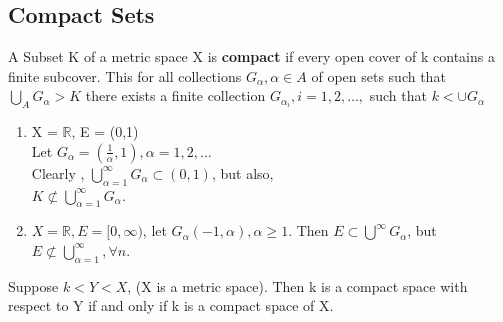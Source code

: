 \documentclass[11pt,fleqn]{book} %
\begin{document}
\subsection{Compact Sets} %

\begin{definition}
	A Subset K of a metric space X is \textbf{compact} if every open  cover of k contains a finite subcover.
	This for all collections $G_\alpha, \alpha \in A$ of open sets such that $\bigcup\limits_A G_\alpha > K$ there exists a finite collection $G_{\alpha_i}, i = 1,2,\dots,$ such that $k < \cup G_\alpha$
\end{definition}

\begin{example}
	\begin{enumerate}[label = \alph*)]	
		\item X = $\mathbb{R}$, E = (0,1)\\
		Let $G_\alpha = (\frac{1}{\alpha},1), \alpha = 1, 2, \dots$\\
		Clearly , $\bigcup\limits^\infty_{\alpha = 1} G_\alpha \subset (0,1)$, but also,\\
		$K \not\subset \bigcup\limits^\infty_{\alpha = 1} G_\alpha$.
		\item $X = \mathbb{R}, E=[0,\infty)$, let $G_\alpha(-1, \alpha), \alpha \ge 1$. Then $E \subset \bigcup\limits^\infty G_\alpha$, but $E \not\subset \bigcup\limits^\infty_{\alpha = 1}, \forall n$.
	\end{enumerate}	
\end{example}

\begin{theorem}
	Suppose $k < Y < X$, (X is a metric space). Then k is a compact space with respect to Y if and only if k is a compact space of X.
\end{theorem}
\end{document}
